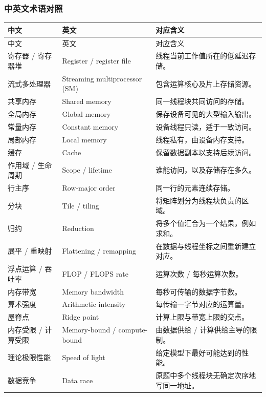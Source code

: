 \subsubsection{中英文术语对照}
\begin{longtable}{L{0.23\textwidth} L{0.34\textwidth} L{0.34\textwidth}}
\toprule
中文 & 英文 & 对应含义 \\
\midrule
\endfirsthead
\toprule
中文 & 英文 & 对应含义 \\
\midrule
\endhead
\bottomrule
\endfoot
寄存器 / 寄存器堆 & Register / register file & 线程当前工作值所在的低延迟存储。 \\
流式多处理器 & Streaming multiprocessor (SM) & 包含运算核心及片上存储资源。 \\
共享内存 & Shared memory & 同一线程块共同访问的存储。 \\
全局内存 & Global memory & 保存设备可见的大型输入输出。 \\
常量内存 & Constant memory & 设备线程只读，适于一致访问。 \\
局部内存 & Local memory & 线程私有，由设备内存支持。 \\
缓存 & Cache & 保留数据副本以支持后续访问。 \\
作用域 / 生命周期 & Scope / lifetime & 谁能访问，以及存储存在多久。 \\
行主序 & Row-major order & 同一行的元素连续存储。 \\
分块 & Tile / tiling & 将矩阵划分为线程块负责的区域。 \\
归约 & Reduction & 将多个值汇合为一个结果，例如求和。 \\
展平 / 重映射 & Flattening / remapping & 在数据与线程坐标之间重新建立对应。 \\
浮点运算 / 吞吐率 & FLOP / FLOPS rate & 运算次数 / 每秒运算次数。 \\
内存带宽 & Memory bandwidth & 每秒可传输的数据字节数。 \\
算术强度 & Arithmetic intensity & 每传输一字节对应的运算量。 \\
屋脊点 & Ridge point & 计算上限与带宽上限的交点。 \\
内存受限 / 计算受限 & Memory-bound / compute-bound & 由数据供给 / 计算供给主导的限制。 \\
理论极限性能 & Speed of light & 给定模型下最好可能达到的性能。 \\
数据竞争 & Data race & 原题中多个线程块无确定次序地写同一地址。 \\
\end{longtable}

